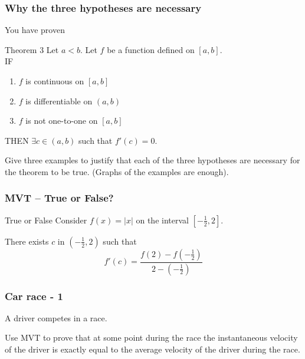 \documentclass[14pt]{beamer}
\newcommand{\setsize}[1]{\fontsize{#1}{#1}\selectfont} %
\newcommand{\smallerfont}{\setsize{13}} %
\begin{document}
	\begin{frame}
		\frametitle{Why the three hypotheses are necessary}

		You have proven

		\begin{block}{Theorem 3}
			Let $a<b$. Let $f$ be a function defined on $[a,b]$. \\ IF
			\begin{enumerate}
				\item $f$ is continuous on $[a,b]$

				\item $f$ is differentiable on $(a,b)$

				\item $f$ is not one-to-one on $[a,b]$
			\end{enumerate}
			THEN $\displaystyle \exists c \in (a,b)$ such that $f'(c)=0$.
		\end{block}

		\vfill

		Give three examples to justify that each of the three hypotheses are necessary
		for the theorem to be true. (Graphs of the examples are enough).
	\end{frame}
	\begin{frame}[t]
		\frametitle{MVT -- True or False?}

		\begin{block}{True or False}
			Consider $f(x) = |x|$ on the interval $[-\frac{1}{2}, 2]$.

			There exists $c$ in $(-\frac{1}{2},2)$ such that
			\[
				f'(c) = \frac{f(2) - f(-\frac{1}{2})}{2-(-\frac{1}{2})}
			\]
		\end{block}
	\end{frame}

	\begin{frame}[t]
		\smallerfont
		\frametitle{Car race - 1}

		A driver competes in a race.

		\medskip
		Use MVT to prove that at some point during the race the instantaneous
		velocity of the driver is exactly equal to the average velocity of the
		driver during the race.
	\end{frame}
\end{document}
